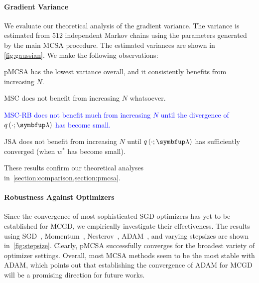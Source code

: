 \paragraph{Gradient Variance}
We evaluate our theoretical analysis of the gradient variance.
The variance is estimated from \(512\) independent Markov chains using the parameters generated by the main MCSA procedure.
The estimated variances are shown in \cref{fig:gaussian}.
We make the following observations:
\begin{enumerate*}[label=\textbf{(\roman*)}]
  \item pMCSA has the lowest variance overall, and it consistently benefits from increasing \(N\).
  \item MSC does not benefit from increasing \(N\) whatsoever.
    
  \item \textcolor{blue}{
    MSC-RB does not benefit much from increasing \(N\) until the divergence of \(q\left(\cdot; \vlambda\right)\) has become small.
    }
  \item JSA does not benefit from increasing \(N\) until \(q\left(\cdot; \vlambda\right)\) has sufficiently converged (when \(w^*\) has become small).
\end{enumerate*}
These results confirm our theoretical analyses in~\cref{section:comparison,section:pmcsa}.


\vspace{-1.5ex}
\paragraph{Robustness Against Optimizers}
Since the convergence of most sophisticated SGD optimizers has yet to be established for MCGD, we empirically investigate their effectiveness.
The results using SGD~\citep{robbins_stochastic_1951, bottou_optimization_2018a}, Momentum~\citep{polyak_methods_1964}, Nesterov~\citep{nesterov_method_1983}, ADAM~\citep{kingma_adam_2015}, and varying stepsizes are shown in~\cref{fig:stepsize}.
Clearly, pMCSA successfully converges for the broadest variety of optimizer settings.
Overall, most MCSA methods seem to be the most stable with ADAM, which points out that establishing the convergence of ADAM for MCGD will be a promising direction for future works.



